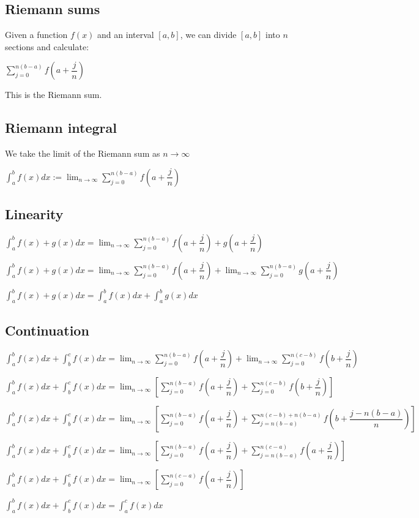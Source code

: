 
\subsection{Riemann sums}

Given a function \(f(x)\) and an interval \([a,b]\), we can divide \([a,b]\) into \(n\) sections and calculate:

\(\sum_{j=0}^{n(b-a)}f(a+\dfrac{j}{n})\)

This is the Riemann sum.

\subsection{Riemann integral}

We take the limit of the Riemann sum as \(n\rightarrow \infty\)

\(\int_a^b f(x)dx:= \lim_{n\rightarrow \infty } \sum_{j=0}^{n(b-a)} f(a+ \dfrac{j}{n} )\)

\subsection{Linearity}

\(\int_a^bf(x)+g(x)dx=\lim_{n\rightarrow \infty }\sum_{j=0}^{n(b-a)}f(a+\dfrac{j}{n})+g(a+\dfrac{j}{n})\)

\(\int_a^bf(x)+g(x)dx=\lim_{n\rightarrow \infty }\sum_{j=0}^{n(b-a)}f(a+\dfrac{j}{n})+\lim_{n\rightarrow \infty }\sum_{j=0}^{n(b-a)}g(a+\dfrac{j}{n})\)

\(\int_a^bf(x)+g(x)dx=\int_a^bf(x)dx +\int_a^bg(x)dx\)

\subsection{Continuation}

\(\int_a^bf(x)dx+\int_b^cf(x)dx=\lim_{n\rightarrow \infty }\sum_{j=0}^{n(b-a)}f(a+\dfrac{j}{n})+\lim_{n\rightarrow \infty }\sum_{j=0}^{n(c-b)}f(b+\dfrac{j}{n})\)

\(\int_a^bf(x)dx+\int_b^cf(x)dx=\lim_{n\rightarrow \infty }[\sum_{j=0}^{n(b-a)}f(a+\dfrac{j}{n})+\sum_{j=0}^{n(c-b)}f(b+\dfrac{j}{n})]\)

\(\int_a^bf(x)dx+\int_b^cf(x)dx=\lim_{n\rightarrow \infty }[\sum_{j=0}^{n(b-a)}f(a+\dfrac{j}{n})+\sum_{j=n(b-a)}^{n(c-b)+n(b-a)}f(b+\dfrac{j-n(b-a)}{n})]\)

\(\int_a^bf(x)dx+\int_b^cf(x)dx=\lim_{n\rightarrow \infty }[\sum_{j=0}^{n(b-a)}f(a+\dfrac{j}{n})+\sum_{j=n(b-a)}^{n(c-a)}f(a+\dfrac{j}{n})]\)

\(\int_a^bf(x)dx+\int_b^cf(x)dx=\lim_{n\rightarrow \infty }[\sum_{j=0}^{n(c-a)}f(a+\dfrac{j}{n})]\)

\(\int_a^bf(x)dx+\int_b^cf(x)dx=\int_a^cf(x)dx\)

